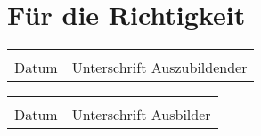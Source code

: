 \documentclass[11pt,a4paper]{article}
\begin{document}
\setlength{\parindent}{0cm}
\section*{Für die Richtigkeit}
\vspace{.5cm}
\begin{multicols}{2}
	\begin{tabular}{@{}p{2cm}p{5cm}@{}}
		\hrulefill & \hrulefill\\
		Datum & Unterschrift Auszubildender
	\end{tabular}
	\columnbreak
	\begin{tabular}{@{}p{2cm}p{5cm}@{}}
		\hrulefill & \hrulefill\\
		Datum & Unterschrift Ausbilder
	\end{tabular}
\end{multicols}
	
\end{document}

